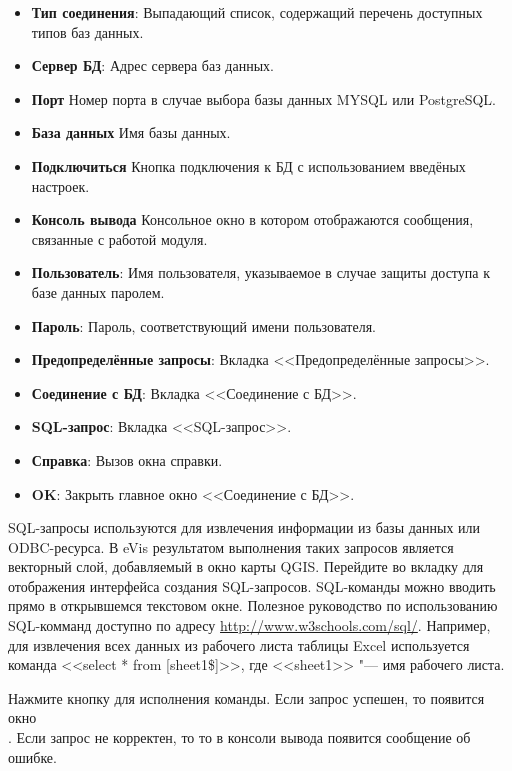 \begin{itemize}[label=--]
\item \textbf{Тип соединения}: Выпадающий список, содержащий перечень
доступных типов баз данных.
\item \textbf{Сервер БД}: Адрес сервера баз данных.
\item \textbf{Порт} Номер порта в случае выбора базы данных MYSQL или
PostgreSQL.
\item \textbf{База данных} Имя базы данных.
\item \textbf{Подключиться} Кнопка подключения к БД с использованием введёных
настроек.
\item \textbf{Консоль вывода} Консольное окно в котором отображаются
сообщения, связанные с работой модуля.
\item \textbf{Пользователь}: Имя пользователя, указываемое в случае
защиты доступа к базе данных паролем.
\item \textbf{Пароль}: Пароль, соответствующий имени пользователя.
\item \textbf{Предопределённые запросы}: Вкладка <<Предопределённые запросы>>.
\item \textbf{Соединение с БД}: Вкладка <<Соединение с БД>>.
\item \textbf{SQL-запрос}: Вкладка <<SQL-запрос>>.
\item \textbf{Справка}: Вызов окна справки.
\item \textbf{OK}: Закрыть главное окно <<Соединение с БД>>.
\end{itemize}

\label{evis_running_sql}

SQL-запросы используются для извлечения информации из базы данных или
ODBC-ресурса. В eVis результатом выполнения таких запросов является векторный
слой, добавляемый в окно карты QGIS. Перейдите во вкладку 
для отображения интерфейса создания SQL-запросов. SQL-команды можно вводить
прямо в открывшемся текстовом окне. Полезное руководство по использованию
SQL-комманд доступно по адресу \url{http://www.w3schools.com/sql/}. Например,
для извлечения всех данных из рабочего листа таблицы Excel используется
команда <<select * from [sheet1\$]>>, где <<sheet1>> "--- имя рабочего листа.

Нажмите кнопку  для исполнения команды. Если запрос успешен,
то появится окно \\
. Если запрос не корректен, то то
в консоли вывода появится сообщение об ошибке.

